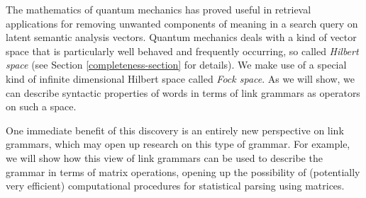 The mathematics of quantum mechanics has proved useful in retrieval applications for removing unwanted components of meaning in a search query \citep{Widdows:03} on latent semantic analysis vectors.
Quantum mechanics deals with a kind of vector space that is particularly well behaved and frequently occurring, so called \emph{Hilbert space} (see Section \ref{completeness-section} for details).
We make use of a special kind of infinite dimensional Hilbert space called \emph{Fock space}. As we will show, we can describe syntactic properties of words in terms of link grammars as operators on such a space.

One immediate benefit of this discovery is an entirely new perspective on link grammars, which may open up research on this type of grammar. For example, we will show how this view of link grammars can be used to describe the grammar in terms of matrix operations, opening up the possibility of (potentially very efficient) computational procedures for statistical parsing using matrices.




